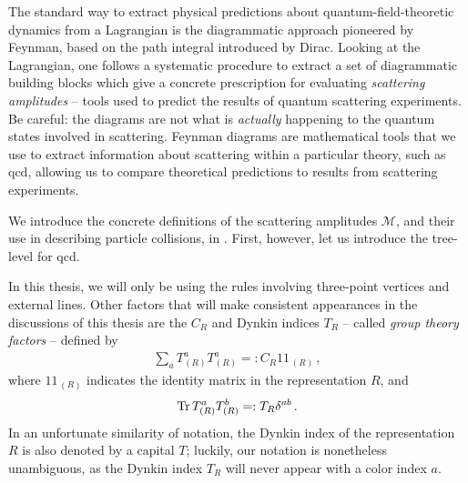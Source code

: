 The standard way to extract physical predictions about quantum-field-theoretic dynamics from a Lagrangian is the diagrammatic approach pioneered by Feynman, based on the path integral introduced by Dirac.
%
Looking at the Lagrangian, one follows a systematic procedure to extract a set of diagrammatic building blocks which give a concrete prescription for evaluating \textit{scattering amplitudes} -- tools used to predict the results of quantum scattering experiments.
%
Be careful:
%
the diagrams are not what is \textit{actually} happening to the quantum states involved in scattering.
%
Feynman diagrams are mathematical tools that we use to extract information about scattering within a particular theory, such as \gls{qcd}, allowing us to compare theoretical predictions to results from scattering experiments.


We introduce the concrete definitions of the scattering amplitudes \(\mathcal{M}\), and their use in describing particle collisions, in .
%
First, however, let us introduce the tree-level  for \gls{qcd}.





In this thesis, we will only be using the rules involving three-point vertices and external lines.
%
Other factors that will make consistent appearances in the discussions of this thesis are the  \(C_R\) and Dynkin indices \(T_R\) -- called \textit{group theory factors} -- defined by
\begin{align}
    \sum_a
    T^a_{(R)} T^a_{(R)}
    =:
    C_R
    1\!\!1_{\,(R)}
    \,,
\end{align}
where \(1\!\!1_{\,(R)}\) indicates the identity matrix in the representation \(R\), and
\begin{align}
    \Tr T^a_{(R)} T^b_{(R)}
    =:
    T_R \delta^{ab}
    \,.
\end{align}
In an unfortunate similarity of notation, the Dynkin index of the representation \(R\) is also denoted by a capital \(T\);
%
luckily, our notation is nonetheless unambiguous, as the Dynkin index \(T_R\) will never appear with a color index \(a\).

